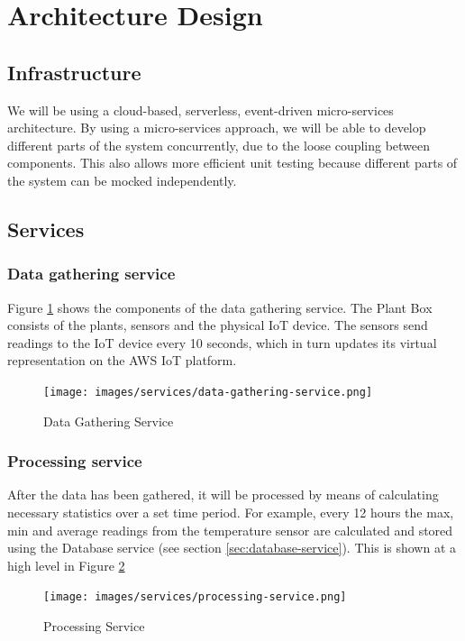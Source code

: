 \documentclass{article}
\begin{document}
\section{Architecture Design}

\subsection{Infrastructure}
We will be using a cloud-based, serverless, event-driven micro-services architecture. By using a micro-services approach, we will be able to develop different parts of the system concurrently, due to the loose coupling between components. This also allows more efficient unit testing because different parts of the system can be mocked independently. 

\subsection{Services}

\subsubsection{Data gathering service}
Figure \ref{fig:data-gathering} shows the components of the data gathering service. The Plant Box consists of the plants, sensors and the physical IoT device. The sensors send readings to the IoT device every 10 seconds, which in turn updates its virtual representation on the AWS IoT platform.

\begin{figure}[h!]
  \texttt{[image: images/services/data-gathering-service.png]}
  \caption{Data Gathering Service}
  \label{fig:data-gathering}
\end{figure}

\subsubsection{Processing service}
After the data has been gathered, it will be processed by means of calculating necessary statistics over a set time period. For example, every 12 hours the max, min and average readings from the temperature sensor are calculated and stored using the Database service (see section \ref{sec:database-service}). This is shown at a high level in Figure \ref{fig:processing-service}

\begin{figure}[h!]
  \texttt{[image: images/services/processing-service.png]}
  \caption{Processing Service}
  \label{fig:processing-service}
\end{figure}
\end{document}
